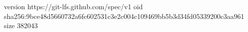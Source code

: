 version https://git-lfs.github.com/spec/v1
oid sha256:9bce48d5660732a6fc602531c3e2c004c109469bb5b3d34fd05339200c3aa961
size 382043
